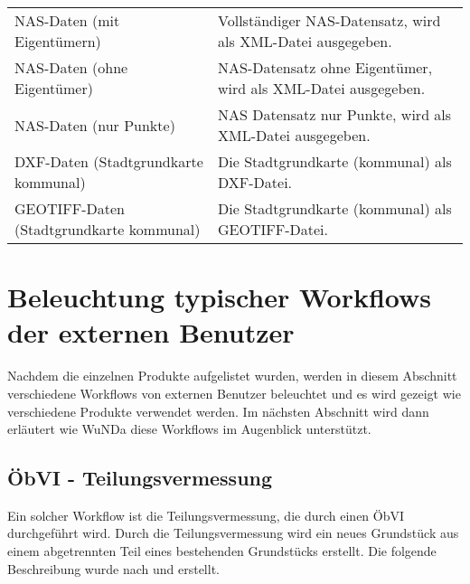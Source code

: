 \begin{minipage}{\linewidth}
\centering
{} \label{tab-daten-kataster}
\begin{tabular}{|p{}|p{}|}
	\hline 
	 \rowcolor{gray} 
	\head{Produktname}  & \head{Beschreibung} \tabularnewline
	\hline 					
	\acs{NAS}-Daten (mit Eigentümern)
	&
	Vollständiger \acs{NAS}-Datensatz, wird als \acs{XML}-Datei ausgegeben. \\
	\hline
	\acs{NAS}-Daten (ohne Eigentümer)
	&
	\acs{NAS}-Datensatz ohne Eigentümer, wird als \acs{XML}-Datei ausgegeben. \\
	\hline
	\acs{NAS}-Daten (nur Punkte)
	&
	\acs{NAS} Datensatz nur Punkte, wird als \acs{XML}-Datei ausgegeben. \\
	\hline
	\acs{DXF}-Daten (Stadtgrundkarte kommunal)
	&
	Die Stadtgrundkarte (kommunal) als \acs{DXF}-Datei.  \\
	\hline
	GEOTIFF-Daten (Stadtgrundkarte kommunal)
	&
	Die Stadtgrundkarte (kommunal) als GEOTIFF-Datei. \\
	\hline	
\end{tabular}
 \end{minipage}

\section{Beleuchtung typischer Workflows der externen Benutzer}
Nachdem die einzelnen Produkte aufgelistet wurden, werden in diesem Abschnitt verschiedene Workflows von externen Benutzer beleuchtet und es wird gezeigt wie verschiedene Produkte verwendet werden. Im nächsten Abschnitt wird dann erläutert wie \ac{WuNDa} diese Workflows im Augenblick unterstützt.


\subsection{ÖbVI - Teilungsvermessung}
Ein solcher Workflow ist die Teilungsvermessung, die durch einen \ac{ÖbVI} durchgeführt wird. Durch die Teilungsvermessung wird ein neues Grundstück aus einem abgetrennten Teil eines bestehenden Grundstücks erstellt. Die folgende Beschreibung wurde nach \autocite{klein-vermessung} und \autocite{jungemann-alltag} erstellt.

